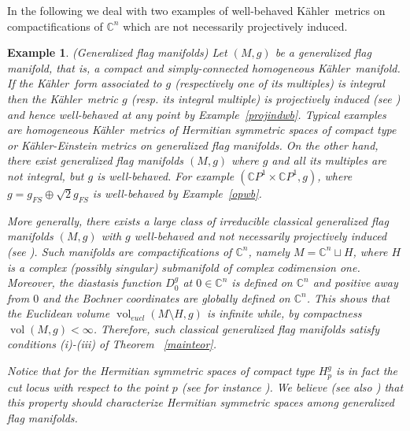 \documentclass[12pt]{amsart}
\newcommand{\C}{\mathbb{C}}
\newcommand{\K}{K\"{a}hler}
\newcommand{\vol}{{\operatorname{vol}}}
\newtheorem{ex}{Example}
\begin{document}
In the following we deal with  two examples of  
well-behaved \K\  metrics on compactifications of $\C^n$ which are not necessarily projectively induced.
\begin{ex}\rm\label{genflag}(Generalized flag manifolds)
	Let $(M, g)$ be a generalized flag manifold, that is, a compact and simply-connected homogeneous \K\  manifold.
	If  the \K\ form associated to $g$ (respectively one of  its multiples) is  integral  then the  \K\ metric $g$ (resp. its integral multiple)  is projectively induced  (see \cite{LoiZuddasGromovWidthHKM})
	and hence well-behaved at any point  by Example~\ref{projindwb}. 
	Typical examples are homogeneous \K\ metrics of Hermitian symmetric spaces of compact type or \K-Einstein metrics on generalized flag manifolds.
	On the other hand, there exist   generalized flag manifolds $(M, g)$
	where $g$ and all its multiples are not integral, but 
	$g$ is well-behaved. For example $(\C P^1\times \C P^1, g)$, where $g=g_{FS}\oplus\sqrt{2}g_{FS}$  is well-behaved  by Example~\ref{opwb}.
	
	More generally, there exists a large class of  irreducible classical generalized flag manifolds $(M, g)$ with $g$ well-behaved and not necessarily projectively induced (see \cite[Theorem~1]{LoiMossaZuddas19BochnerFlag}).
	Such manifolds are compactifications of $\C^n$, namely   $M=\C^n \sqcup H$, where $H$ is a complex (possibly singular) submanifold of complex codimension one.
	Moreover, the diastasis function $D_0^g$ at $0\in\C^n$ is defined on $\C^n$ and positive away from $0$  and the Bochner coordinates are globally defined on $\C^n$. This shows that the Euclidean volume $\vol_{eucl}(M\setminus H,g)$ is infinite while, by compactness $\vol(M,g)<\infty$. Therefore, such classical generalized flag manifolds satisfy conditions (i)-(iii) of Theorem ~\ref{mainteor}.
	
	Notice that for  the Hermitian symmetric spaces of compact type
	$H_p^g$ is in fact the cut locus with respect to the point $p$ (see for instance \cite{Loi06DiastasisHSS,LoiMossa11DiastaticExp,Tasaki85CutLocusDiastasis}).
	We believe (see also \cite[Conjecture p.~499]{LoiMossaZuddas19BochnerFlag}) that this property should characterize Hermitian symmetric spaces among generalized flag manifolds.
\end{ex}
\end{document}
